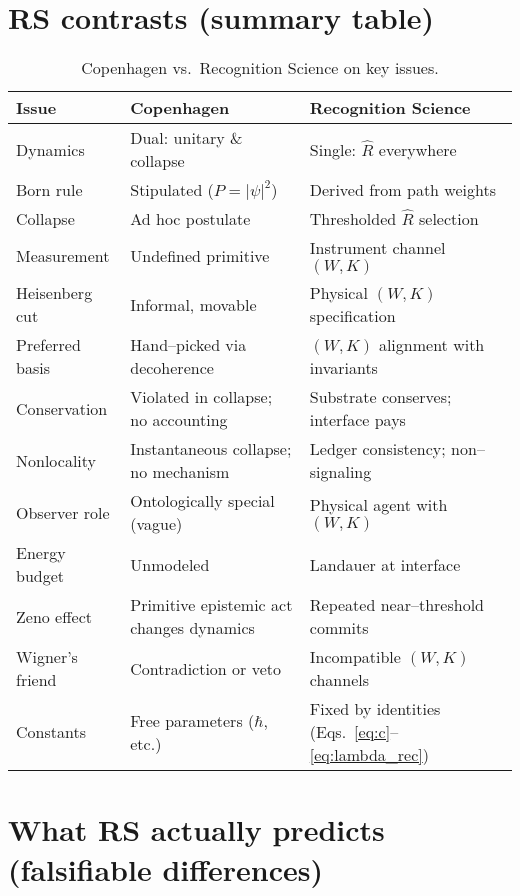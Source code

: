 \documentclass[11pt]{article}
\begin{document}
\section{RS contrasts (summary table)}

\begin{table}[h]
\centering
\small
\begin{tabular}{|p{3.5cm}|p{5cm}|p{5.5cm}|}
\hline
\textbf{Issue} & \textbf{Copenhagen} & \textbf{Recognition Science} \\
\hline
Dynamics & Dual: unitary \& collapse & Single: $\hat R$ everywhere \\
\hline
Born rule & Stipulated ($P=|\psi|^2$) & Derived from path weights \\
\hline
Collapse & Ad hoc postulate & Thresholded $\hat R$ selection \\
\hline
Measurement & Undefined primitive & Instrument channel $(W,K)$ \\
\hline
Heisenberg cut & Informal, movable & Physical $(W,K)$ specification \\
\hline
Preferred basis & Hand--picked via decoherence & $(W,K)$ alignment with invariants \\
\hline
Conservation & Violated in collapse; no accounting & Substrate conserves; interface pays \\
\hline
Nonlocality & Instantaneous collapse; no mechanism & Ledger consistency; non--signaling \\
\hline
Observer role & Ontologically special (vague) & Physical agent with $(W,K)$ \\
\hline
Energy budget & Unmodeled & Landauer at interface \\
\hline
Zeno effect & Primitive epistemic act changes dynamics & Repeated near--threshold commits \\
\hline
Wigner's friend & Contradiction or veto & Incompatible $(W,K)$ channels \\
\hline
Constants & Free parameters ($\hbar$, etc.) & Fixed by identities (Eqs.~\ref{eq:c}--\ref{eq:lambda_rec}) \\
\hline
\end{tabular}
\caption{Copenhagen vs.\ Recognition Science on key issues.}
\end{table}

\section{What RS actually predicts (falsifiable differences)}
\end{document}
